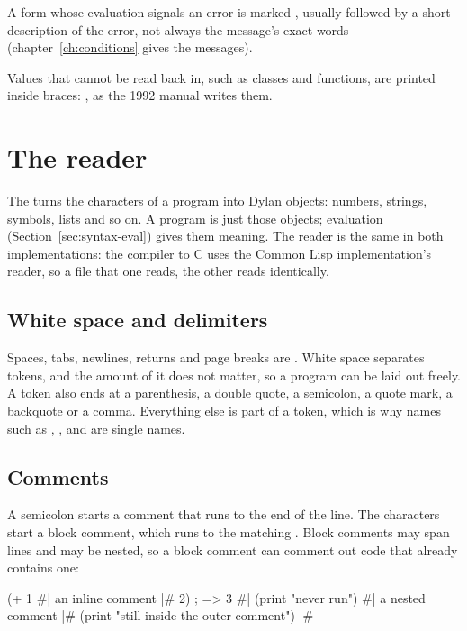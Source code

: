 \noindent A form whose evaluation signals an error is marked
, usually followed by a short description of the error,
not always the message's exact words (chapter~\ref{ch:conditions} gives
the messages).

Values that cannot be read back in, such as classes and functions, are
printed inside braces: , as the 1992
manual writes them.

\section{The reader}\label{sec:syntax-reader}

The  turns the characters of a program into Dylan objects:
numbers, strings, symbols, lists and so on. A program is just those objects;
evaluation (Section~\ref{sec:syntax-eval}) gives them meaning. The reader is the
same in both implementations: the compiler to C uses the Common Lisp
implementation's reader, so a file that one reads, the other reads
identically.

\subsection{White space and delimiters}

Spaces, tabs, newlines, returns and page breaks are . White
space separates tokens, and the amount of it does not matter, so a program
can be laid out freely. A token also ends at a parenthesis, a double quote,
a semicolon, a quote mark, a backquote or a comma. Everything else is
part of a token, which is why names such as , ,
 and  are single names.

\subsection{Comments}\label{sec:syntax-comments}

A semicolon starts a comment that runs to the end of the
line. The characters \code{\#|} start a block comment, which runs to the
matching \code{|\#}. Block comments may span lines and may be nested, so a
block comment can comment out code that already contains one:

\begin{dylan}
(+ 1 #| an inline comment |# 2)   ; => 3
#| (print "never run")
   #| a nested comment |#
   (print "still inside the outer comment") |#
\end{dylan}

